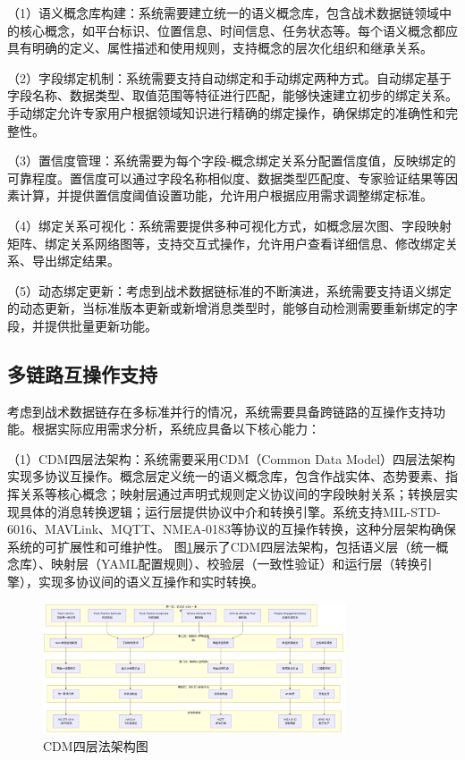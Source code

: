 （1）语义概念库构建：系统需要建立统一的语义概念库，包含战术数据链领域中的核心概念，如平台标识、位置信息、时间信息、任务状态等。每个语义概念都应具有明确的定义、属性描述和使用规则，支持概念的层次化组织和继承关系。

（2）字段绑定机制：系统需要支持自动绑定和手动绑定两种方式。自动绑定基于字段名称、数据类型、取值范围等特征进行匹配，能够快速建立初步的绑定关系。手动绑定允许专家用户根据领域知识进行精确的绑定操作，确保绑定的准确性和完整性。

（3）置信度管理：系统需要为每个字段-概念绑定关系分配置信度值，反映绑定的可靠程度。置信度可以通过字段名称相似度、数据类型匹配度、专家验证结果等因素计算，并提供置信度阈值设置功能，允许用户根据应用需求调整绑定标准。

（4）绑定关系可视化：系统需要提供多种可视化方式，如概念层次图、字段映射矩阵、绑定关系网络图等，支持交互式操作，允许用户查看详细信息、修改绑定关系、导出绑定结果。

（5）动态绑定更新：考虑到战术数据链标准的不断演进，系统需要支持语义绑定的动态更新，当标准版本更新或新增消息类型时，能够自动检测需要重新绑定的字段，并提供批量更新功能。

\subsection{多链路互操作支持}
考虑到战术数据链存在多标准并行的情况，系统需要具备跨链路的互操作支持功能\cite{AFCEA_Link16_Improvements_2022}。根据实际应用需求分析，系统应具备以下核心能力：

（1）CDM四层法架构：系统需要采用CDM（Common Data Model）四层法架构实现多协议互操作。概念层定义统一的语义概念库，包含作战实体、态势要素、指挥关系等核心概念；映射层通过声明式规则定义协议间的字段映射关系；转换层实现具体的消息转换逻辑；运行层提供协议中介和转换引擎。系统支持MIL-STD-6016、MAVLink、MQTT、NMEA-0183等协议的互操作转换，这种分层架构确保系统的可扩展性和可维护性。
图\ref{fig_cdm_architecture}展示了CDM四层法架构，包括语义层（统一概念库）、映射层（YAML配置规则）、校验层（一致性验证）和运行层（转换引擎），实现多协议间的语义互操作和实时转换。

\begin{figure}[H]
    \centering
    \includegraphics[width=0.8\textwidth,height=0.5\textheight,keepaspectratio]{chapters/fig-0/cdm_architecture.png}
    \caption{CDM四层法架构图}
    \label{fig_cdm_architecture}
\end{figure}

